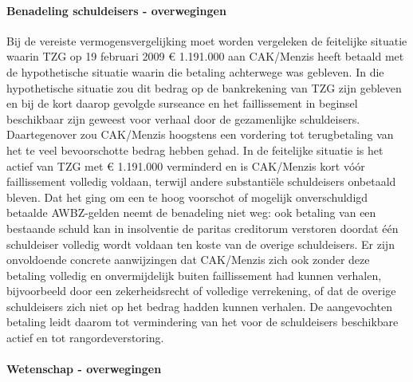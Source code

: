 \documentclass[
  dutch,
  a4paper,
]{article}
\begin{document}
\paragraph{Benadeling schuldeisers - overwegingen}\label{benadeling-schuldeisers---overwegingen-88}

Bij de vereiste vermogensvergelijking moet worden vergeleken de feitelijke situatie waarin TZG op 19 februari 2009 € 1.191.000 aan CAK/Menzis heeft betaald met de hypothetische situatie waarin die betaling achterwege was gebleven. In die hypothetische situatie zou dit bedrag op de bankrekening van TZG zijn gebleven en bij de kort daarop gevolgde surseance en het faillissement in beginsel beschikbaar zijn geweest voor verhaal door de gezamenlijke schuldeisers. Daartegenover zou CAK/Menzis hoogstens een vordering tot terugbetaling van het te veel bevoorschotte bedrag hebben gehad. In de feitelijke situatie is het actief van TZG met € 1.191.000 verminderd en is CAK/Menzis kort vóór faillissement volledig voldaan, terwijl andere substantiële schuldeisers onbetaald bleven. Dat het ging om een te hoog voorschot of mogelijk onverschuldigd betaalde AWBZ-gelden neemt de benadeling niet weg: ook betaling van een bestaande schuld kan in insolventie de paritas creditorum verstoren doordat één schuldeiser volledig wordt voldaan ten koste van de overige schuldeisers. Er zijn onvoldoende concrete aanwijzingen dat CAK/Menzis zich ook zonder deze betaling volledig en onvermijdelijk buiten faillissement had kunnen verhalen, bijvoorbeeld door een zekerheidsrecht of volledige verrekening, of dat de overige schuldeisers zich niet op het bedrag hadden kunnen verhalen. De aangevochten betaling leidt daarom tot vermindering van het voor de schuldeisers beschikbare actief en tot rangordeverstoring.

\paragraph{Wetenschap - overwegingen}\label{wetenschap---overwegingen-88}
\end{document}
